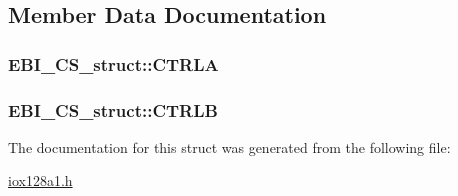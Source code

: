 \subsection{Member Data Documentation}
\hypertarget{struct_e_b_i___c_s__struct_ae9b29f9dbd1bea932ba733d40c53f766}{
\subsubsection[{CTRLA}]{ {\bf EBI\_\-CS\_\-struct::CTRLA}}}
\label{struct_e_b_i___c_s__struct_ae9b29f9dbd1bea932ba733d40c53f766}
\hypertarget{struct_e_b_i___c_s__struct_aa6a952b34e3d124f9c94159f562afd46}{
\subsubsection[{CTRLB}]{ {\bf EBI\_\-CS\_\-struct::CTRLB}}}
\label{struct_e_b_i___c_s__struct_aa6a952b34e3d124f9c94159f562afd46}


The documentation for this struct was generated from the following file:\begin{DoxyCompactItemize}
\item 
\hyperlink{iox128a1_8h}{iox128a1.h}\end{DoxyCompactItemize}
